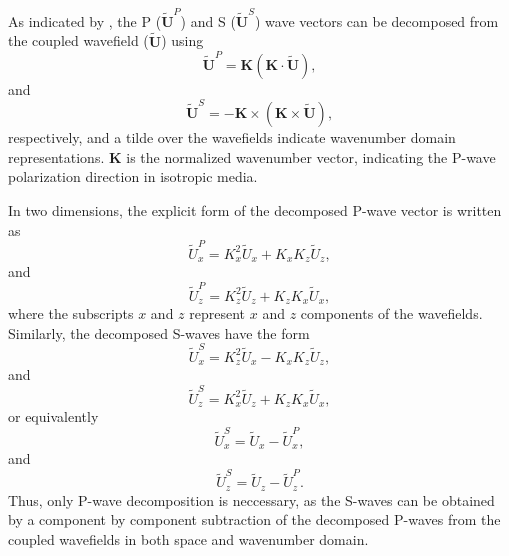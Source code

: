 \documentclass[manuscript,ulem,graphix,revised]{geophysics}
\begin{document}
%
As indicated by \citet{zhang10}, the P ($\tilde{\boldsymbol{U}}^P$) and S ($\tilde{\boldsymbol{U}}^S$) wave vectors can be decomposed from the coupled wavefield ($\tilde{\boldsymbol{U}}$) using
\begin{equation}
\tilde{\boldsymbol{U}}^P = \boldsymbol{K} (\boldsymbol{K} \cdot \tilde{\boldsymbol{U}}),
\label{eqn:p_wave}
\end{equation}
and
\begin{equation}
\tilde{\boldsymbol{U}}^S =-\boldsymbol{K} \times (\boldsymbol{K} \times \tilde{\boldsymbol{U}}),
\label{eqn:p_wave}
\end{equation}
respectively, and a tilde over the wavefields indicate wavenumber domain representations. $\boldsymbol{K}$ is the normalized wavenumber vector, indicating the P-wave polarization direction in isotropic media.

In two dimensions, the explicit form of the decomposed P-wave vector is written as
\begin{equation}
\tilde{U}^P_x = K^2_x \tilde{U}_x + K_x K_z \tilde{U}_z,
\label{eqn:p_wave1}
\end{equation}
and 
\begin{equation}
\tilde{U}^P_z = K^2_z \tilde{U}_z + K_z K_x \tilde{U}_x,
\label{eqn:p_wave2}
\end{equation}
where the subscripts $x$ and $z$ represent $x$ and $z$ components of the wavefields. Similarly, the decomposed S-waves have the form
\begin{equation}
\tilde{U}^S_x = K^2_z \tilde{U}_x - K_x K_z \tilde{U}_z,
\label{eqn:s_wave1}
\end{equation}
and 
\begin{equation}
\tilde{U}^S_z = K^2_x \tilde{U}_z + K_z K_x \tilde{U}_x,
\label{eqn:s_wave2}
\end{equation}
or equivalently
\begin{equation}
\tilde{U}^S_x = \tilde{U}_x - \tilde{U}^P_x,
\label{eqn:s_wave3}
\end{equation}
and 
\begin{equation}
\tilde{U}^S_z = \tilde{U}_z - \tilde{U}^P_z.
\label{eqn:s_wave4}
\end{equation}
Thus, only P-wave decomposition is neccessary, as the S-waves can be obtained by a component by component subtraction of the decomposed P-waves from the coupled wavefields in both space and wavenumber domain.
\end{document}
